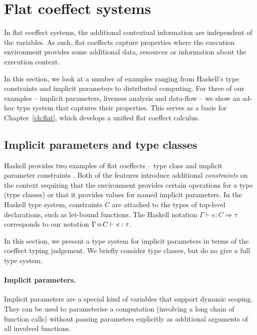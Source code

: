 
\section{Flat coeffect systems}

In flat coeffect systems, the additional contextual information are independent of the variables.
As such, flat coeffects capture properties where the execution environment provides some 
additional data, resources or information about the execution context.

In this section, we look at a number of examples ranging from Haskell's type constraints
and implicit parameters to distributed computing. For three of our examples --
implicit parameters, liveness analysis and data-flow -- we show an ad-hoc type system that
captures their properties. This serves as a basis for Chapter~\ref{ch:flat}, which develops
a unified flat coeffect calculus.


\subsection{Implicit parameters and type classes} 

Haskell provides two examples of flat coeffects -- type class and implicit parameter constraints
\cite{app-type-classes,app-implicit-parameters}. Both of the features introduce additional 
\emph{constraints} on the context requiring that the environment provides certain operations for
a type (type classes) or that it provides values for named implicit parameters.
In the Haskell type system, constraints $C$ are attached to the types of top-level declarations,
such as let-bound functions. The Haskell notation $\Gamma \vdash e : C \Rightarrow \tau$ 
corresponds to our notation $\Gamma \,\text{\scriptsize @}\, {{\text{$C$}}} \vdash e : \tau$. 

In this section, we present a type system for implicit parameters in terms of the coeffect typing
judgement. We briefly consider type classes, but do no give a full type system.

\paragraph{Implicit parameters.}
Implicit parameters are a special kind of variables that support dynamic scoping.
They can be used to parameterise a computation (involving a long chain of function calls)
without passing parameters explicitly as additional arguments of all involved functions. 


